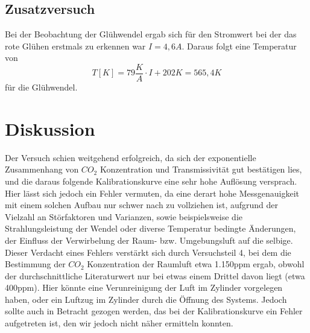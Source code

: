 \documentclass{article}
\begin{document}
            \subsection{Zusatzversuch}
                Bei der Beobachtung der Glühwendel ergab sich für den Stromwert bei der
                das rote Glühen erstmals zu erkennen war $I = 4,6A$.
                Daraus folgt eine Temperatur von 
                \begin{equation}
                    T[K] = 79\frac{K}{A}\cdot I +202K = 565,4K 
                \end{equation}
                für die Glühwendel.\\
        \section{Diskussion} 
            Der Versuch schien weitgehend erfolgreich, da sich der exponentielle Zusammenhang von
            $CO_2$ Konzentration und Transmissivität gut bestätigen lies, und die daraus folgende
            Kalibrationskurve eine sehr hohe Auflösung versprach. Hier lässt sich jedoch ein Fehler vermuten,
            da eine derart hohe Messgenauigkeit mit einem solchen Aufbau nur schwer nach zu vollziehen
            ist, aufgrund der Vielzahl an Störfaktoren und Varianzen, sowie beispielsweise die 
            Strahlungsleistung der Wendel oder diverse Temperatur bedingte Änderungen, der Einfluss
            der Verwirbelung der Raum- bzw. Umgebungsluft auf die selbige. Dieser Verdacht eines Fehlers
            verstärkt sich durch Versuchsteil 4, bei dem die Bestimmung der $CO_2$ Konzentration der Raumluft
            etwa 1.150ppm ergab, obwohl der durchschnittliche Literaturwert nur bei etwas einem Drittel davon
            liegt (etwa 400ppm). Hier könnte eine Verunreinigung der Luft im Zylinder vorgelegen haben,
            oder ein Luftzug im Zylinder durch die Öffnung des Systems. Jedoch sollte auch in Betracht
            gezogen werden, das bei der Kalibrationskurve ein Fehler aufgetreten ist, den wir jedoch nicht
            näher ermitteln konnten.
\end{document}
